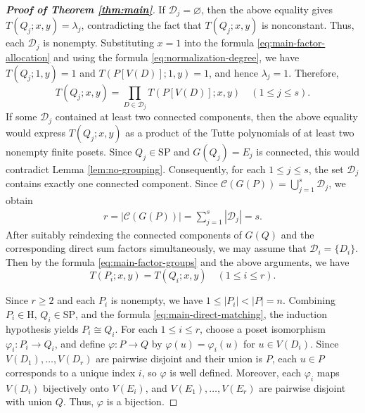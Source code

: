 \documentclass[10pt,a4paper]{amsart}
\begin{document}
\begin{proof}[\rm\textbf{Proof of Theorem \ref{thm:main}}]
If $\mathcal D_j=\varnothing$, then the above equality gives
$T(Q_j;x,y)=\lambda_j$, contradicting the fact that $T(Q_j;x,y)$ is nonconstant.
Thus, each $\mathcal D_j$ is nonempty.
Substituting $x=1$ into the formula \eqref{eq:main-factor-allocation}
and using the formula \eqref{eq:normalization-degree}, we have $T(Q_j;1,y)=1$ and $T(P[V(D)];1,y)=1$,
and hence $\lambda_j=1$. Therefore,
\begin{equation}\label{eq:main-factor-groups}
T(Q_j;x,y)=\prod_{D\in\mathcal D_j}T(P[V(D)];x,y)\quad(1\leq j\leq s).
\end{equation}
If some $\mathcal D_j$ contained at least two connected components,
then the above equality would express $T(Q_j;x,y)$ as a product of the Tutte polynomials
of at least two nonempty finite posets.
Since $Q_j\in\mathrm{SP}$ and $G(Q_j)=E_j$ is connected,
this would contradict Lemma \ref{lem:no-grouping}.
Consequently, for each $1\leq j\leq s$,
the set $\mathcal D_j$ contains exactly one connected component.
Since $\mathcal C(G(P))=\bigcup_{j=1}^{s}\mathcal D_j$, we obtain 
\begin{eqnarray*}
r=|\mathcal C(G(P))|=\sum_{j=1}^{s}|\mathcal D_j|=s.
\end{eqnarray*}
After suitably reindexing the connected components of $G(Q)$
and the corresponding direct sum factors simultaneously,
we may assume that $\mathcal D_i=\{D_i\}$.
Then by the formula \eqref{eq:main-factor-groups} and the above arguments, we have
\begin{equation}\label{eq:main-direct-matching}
T(P_i;x,y)=T(Q_i;x,y)\quad(1\leq i\leq r).
\end{equation}

Since $r\geq2$ and each $P_i$ is nonempty, we have $1\leq|P_i|<|P|=n$.
Combining $P_i\in\mathrm H$, $Q_i\in\mathrm{SP}$,
and the formula \eqref{eq:main-direct-matching}, the induction hypothesis yields $P_i\cong Q_i$.
For each $1\leq i\leq r$, choose a poset isomorphism
$\varphi_i:P_i\to Q_i$, and define $\varphi:P\to Q$ by
$\varphi(u)=\varphi_i(u)$ for $u\in V(D_i)$.
Since $V(D_1),\ldots,V(D_r)$ are pairwise disjoint
and their union is $P$, each $u\in P$ corresponds to a unique index $i$,
so $\varphi$ is well defined.
Moreover, each $\varphi_i$ maps $V(D_i)$ bijectively onto $V(E_i)$,
and $V(E_1),\ldots,V(E_r)$ are pairwise disjoint with union $Q$.
Thus, $\varphi$ is a bijection.


\end{proof}
\end{document}
